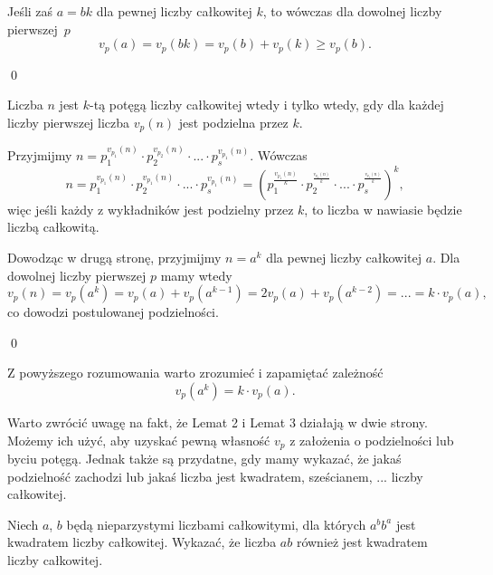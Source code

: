 \vspace{5px}

\noindent
Jeśli zaś $a = bk$ dla pewnej liczby całkowitej $k$, to wówczas dla dowolnej liczby pierwszej~$p$
\[
	v_p(a) = v_p(bk) = v_p(b) + v_p(k) \geqslant v_p(b).
\]

\qed


\noindent
Liczba $n$ jest $k$-tą potęgą liczby całkowitej wtedy i tylko wtedy, gdy dla każdej liczby pierwszej liczba $v_p(n)$ jest podzielna przez $k$. 

\vspace{5px}


\noindent
Przyjmijmy 
$ n = p_1^{v_{p_1}(n)} \cdot p_2^{v_{p_2}(n)} \cdot ... \cdot p_s^{v_{p_1}(n)}. $
Wówczas
\[
	n = p_1^{v_{p_1}(n)} \cdot p_2^{v_{p_1}(n)} \cdot ... \cdot p_s^{v_{p_1}(n)} = \left( p_1^{\frac{v_{p_1}(n)}{k}} \cdot p_2^{^{\frac{v_{p_2}(n)}{k}}} \cdot ... \cdot p_s^{^{\frac{v_{p_s}(n)}{k}}}\right)^k,
\]
więc jeśli każdy z wykładników jest podzielny przez $k$, to liczba w nawiasie będzie liczbą całkowitą.

\vspace{10px}

\noindent
Dowodząc w drugą stronę, przyjmijmy $n = a^k$ dla pewnej liczby całkowitej $a$. Dla dowolnej liczby pierwszej $p$ mamy wtedy
\[
	v_p(n) = v_p(a^k) = v_p(a) + v_p(a^{k - 1}) = 2v_p(a) + v_p(a^{k - 2}) = ... =  k \cdot v_p(a),
\]
co dowodzi postulowanej podzielności.

\qed

\vspace{10px}

\noindent
Z powyższego rozumowania warto zrozumieć i zapamiętać zależność
\[
	v_p(a^k) =  k \cdot v_p(a).
\]

\noindent
Warto zwrócić uwagę na fakt, że Lemat 2 i Lemat 3 działają w dwie strony. Możemy ich użyć, aby uzyskać pewną własność $v_p$ z założenia o podzielności lub byciu potęgą. Jednak także są przydatne, gdy mamy wykazać, że jakaś podzielność zachodzi lub jakaś liczba jest kwadratem, sześcianem, ... liczby całkowitej.

\vspace{10px}


\noindent
Niech $a$, $b$ będą nieparzystymi liczbami całkowitymi, dla których $a^bb^a$ jest kwadratem liczby całkowitej. Wykazać, że liczba $ab$ również jest kwadratem liczby całkowitej.

